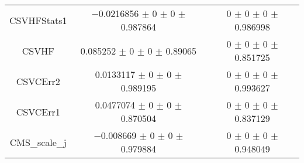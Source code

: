 \begin{table}
\begin{tabular}{ccc}
CSVHFStats1 & \num{-0.0216856} $\pm$ \num{0} $\pm$ \num{0} $\pm$ \num{0.987864} & \num{0} $\pm$ \num{0} $\pm$ \num{0} $\pm$ \num{0.986998}\\
CSVHF & \num{0.085252} $\pm$ \num{0} $\pm$ \num{0} $\pm$ \num{0.89065} & \num{0} $\pm$ \num{0} $\pm$ \num{0} $\pm$ \num{0.851725}\\
CSVCErr2 & \num{0.0133117} $\pm$ \num{0} $\pm$ \num{0} $\pm$ \num{0.989195} & \num{0} $\pm$ \num{0} $\pm$ \num{0} $\pm$ \num{0.993627}\\
CSVCErr1 & \num{0.0477074} $\pm$ \num{0} $\pm$ \num{0} $\pm$ \num{0.870504} & \num{0} $\pm$ \num{0} $\pm$ \num{0} $\pm$ \num{0.837129}\\
CMS\_scale\_j & \num{-0.008669} $\pm$ \num{0} $\pm$ \num{0} $\pm$ \num{0.979884} & \num{0} $\pm$ \num{0} $\pm$ \num{0} $\pm$ \num{0.948049}\\
\bottomrule
\end{tabular}
\end{table}